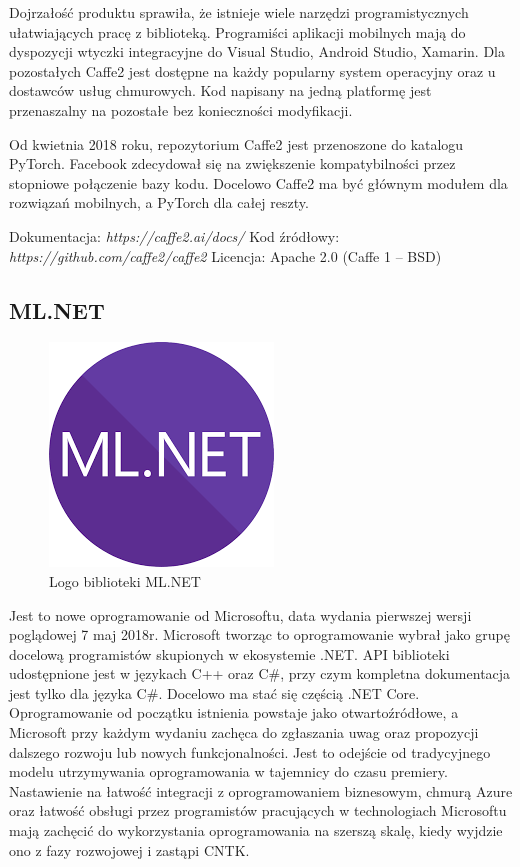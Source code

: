 \documentclass[12pt,a4paper,twoside,titlepage,openright]{book}
\begin{document}
\begin{itemize}
Dojrzałość produktu sprawiła, że istnieje wiele narzędzi programistycznych ułatwiających pracę z biblioteką. Programiści aplikacji mobilnych mają do dyspozycji wtyczki integracyjne do Visual Studio, Android Studio, Xamarin. Dla pozostałych Caffe2 jest dostępne na każdy popularny system operacyjny oraz u dostawców usług chmurowych. Kod napisany na jedną platformę jest przenaszalny na pozostałe bez konieczności modyfikacji.

Od kwietnia 2018 roku, repozytorium Caffe2 jest przenoszone do katalogu PyTorch. Facebook zdecydował się na zwiększenie kompatybilności przez stopniowe połączenie bazy kodu. Docelowo Caffe2 ma być głównym modułem dla rozwiązań mobilnych, a PyTorch dla całej reszty.

\noindent
\newline
Dokumentacja: \textit{https://caffe2.ai/docs/}
\newline
Kod źródłowy: \textit{https://github.com/caffe2/caffe2}
\newline
Licencja: Apache 2.0 (Caffe 1 -- BSD)


\subsection{ML.NET}
\begin{figure}[h]
	\centering
			\includegraphics[resolution=100, scale=1]{ML_NET.png}
		\caption{Logo biblioteki ML.NET}
\end{figure}
Jest to nowe oprogramowanie od Microsoftu, data wydania pierwszej wersji poglądowej 7 maj 2018r. Microsoft tworząc to oprogramowanie wybrał jako grupę docelową programistów skupionych w ekosystemie .NET. API biblioteki udostępnione jest w językach C++ oraz C\#, przy czym kompletna dokumentacja jest tylko dla języka C\#. Docelowo ma stać się częścią .NET Core. Oprogramowanie od początku istnienia powstaje jako otwartoźródłowe, a Microsoft przy każdym wydaniu zachęca do zgłaszania uwag oraz propozycji dalszego rozwoju lub nowych funkcjonalności. Jest to odejście od tradycyjnego modelu utrzymywania oprogramowania w tajemnicy do czasu premiery. Nastawienie na łatwość integracji z oprogramowaniem biznesowym, chmurą Azure oraz łatwość obsługi przez programistów pracujących w technologiach Microsoftu mają zachęcić do wykorzystania oprogramowania na szerszą skalę, kiedy wyjdzie ono z fazy rozwojowej i zastąpi CNTK.


\end{itemize}
\end{document}
